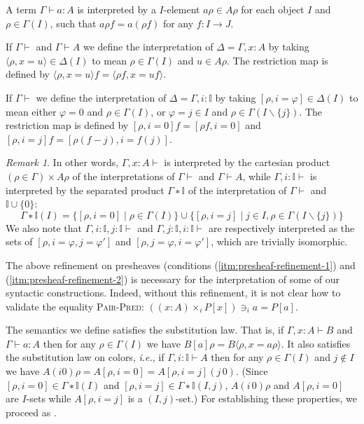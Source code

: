 \documentclass[english]{PaperTools/latex/entcs}
\theoremstyle{plain}
\theoremstyle{definition}
\theoremstyle{remark}
\newtheorem*{remark}{Remark}
\newcommand\CTimes[2]{(#2) ×_{#1}}
\newcommand\op[1]{∋_{#1}}
\def\ie{\textit{i.e.}}
\begin{document}
A term $Γ ⊢ a : A$ is interpreted by a $I$-element $aρ ∈ Aρ$ for each
object $I$ and $ρ ∈ Γ(I)$, such that $aρf = a(ρf)$ for any $f : I → J$.

If $Γ⊢$ and $Γ ⊢ A$ we define the interpretation of $Δ = Γ,x:A$
by taking $⟨ρ,x=u⟩ ∈ Δ(I)$ to mean $ρ ∈ Γ(I)$ and $u ∈ Aρ$.
The restriction map is defined by $⟨ρ,x=u⟩f = ⟨ρf, x=uf⟩$.

If $Γ⊢$ we define the interpretation of $Δ = Γ,i:𝕀$ by taking
$[ρ,i=φ] ∈ Δ(I)$ to mean either $φ = 0$ and $ρ ∈ Γ(I)$, or
$φ = j ∈ I$ and $ρ ∈ Γ(I\backslash\{j\})$.
The restriction map is defined by
$[ρ,i=0]f = [ρf,i=0]$ and $[ρ,i=j]f = [ρ(f-j),i=f(j)]$.
\begin{remark}
  In other words,
  $Γ,x:A⊢$ is interpreted by the cartesian product $(ρ∈Γ) × Aρ$ of the
  interpretations of $Γ⊢$ and $Γ⊢A$, while
  $Γ,i:𝕀⊢$ is interpreted by the separated product \cite[sec.~3.4
  p.~54]{PittsAM:nomsns} $Γ ∗ 𝕀$ of the
  interpretation of $Γ⊢$ and $𝕀 ∪ \{0\}$:
  $$Γ ∗ 𝕀(I) = \{ [ρ,i=0] \mid ρ ∈ Γ(I) \} ∪
               \{ [ρ,i=j] \mid j ∈ I, ρ ∈ Γ(I\backslash\{j\}) \}$$
  We also note that $Γ,i:𝕀,j:𝕀 ⊢$ and $Γ,j:𝕀,i:𝕀 ⊢$ are respectively
  interpreted as the sets of $[ρ,i=φ,j=φ']$ and $[ρ,j=φ,i=φ']$, which are
  trivially isomorphic.
\end{remark}

The above refinement on presheaves (conditions
(\ref{itm:presheaf-refinement-1}) and
(\ref{itm:presheaf-refinement-2}) is necessary for the interpretation
of some of our syntactic constructions.  Indeed, without this refinement,
it is not clear how to validate the equality \textsc{Pair-Pred}:
${{(\CTimes i {x:A} P[x])} \op i a = P[a]}$.

\smallskip
The semantics we define satisfies the substitution law. That is, if $Γ,x:A ⊢ B$
and $Γ ⊢ a:A$ then for any $ρ ∈ Γ(I)$ we have
$B[a]ρ = B⟨ρ,x=aρ⟩$.
It also satisfies the substitution law on colors, \ie, if $Γ,i:𝕀 ⊢ A$
then for any $ρ ∈ Γ(I)$ and $j ∉ I$ we have
$A(i 0)ρ = A[ρ,i=0] = A[ρ,i=j](j\, 0)$.
(Since $[ρ,i=0] ∈ Γ∗𝕀(I)$ and $[ρ,i=j] ∈ Γ∗𝕀(I,j)$, $A(i\, 0)ρ$ and
$A[ρ,i=0]$ are $I$-sets while $A[ρ,i=j]$ is a $(I,j)$-set.)
For establishing these properties, we proceed as \citet{Aczel98onrelating}.
\end{document}
